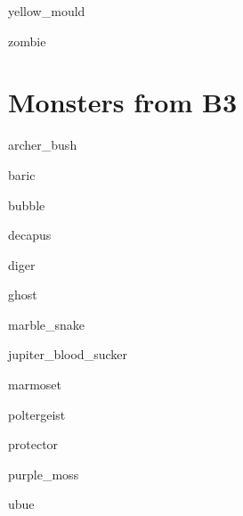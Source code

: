\documentclass[letterpaper,serif]{module}
\begin{document}
\begin{newmonster}{yellow_mould}\end{newmonster}

\begin{newmonster}{zombie}\end{newmonster}

\part{Monsters from B3}

\begin{newmonster}{archer_bush}\end{newmonster}
\begin{newmonster}{baric}\end{newmonster}
\begin{newmonster}{bubble}\end{newmonster}
\begin{newmonster}{decapus}\end{newmonster}
\begin{newmonster}{diger}\end{newmonster}
\begin{newmonster}{ghost}\end{newmonster}
\begin{newmonster}{marble_snake}\end{newmonster}
\begin{newmonster}{jupiter_blood_sucker}\end{newmonster}
\begin{newmonster}{marmoset}\end{newmonster}
\begin{newmonster}{poltergeist}\end{newmonster}
\begin{newmonster}{protector}\end{newmonster}
\begin{newmonster}{purple_moss}\end{newmonster}
\begin{newmonster}{ubue}\end{newmonster}
\end{document}
